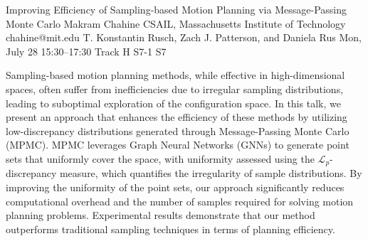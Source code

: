 \begin{talk}
  {Improving Efficiency of Sampling-based Motion Planning via Message-Passing Monte Carlo}%
  {Makram Chahine}%
  {CSAIL, Massachusetts Institute of Technology}%
  {chahine@mit.edu}%
  {T. Konstantin Rusch, Zach J. Patterson, and Daniela Rus}%
  {}%
  {Mon, July 28 15:30–17:30 Track H}%
  {S7-1}%
  {S7}%
  
				
			
Sampling-based motion planning methods, while effective in high-dimensional spaces, often suffer from inefficiencies due to irregular sampling distributions, leading to suboptimal exploration of the configuration space. In this talk, we present an approach that enhances the efficiency of these methods by utilizing low-discrepancy distributions generated through Message-Passing Monte Carlo (MPMC). MPMC leverages Graph Neural Networks (GNNs) to generate point sets that uniformly cover the space, with uniformity assessed using the $\mathcal{L}_p$-discrepancy measure, which quantifies the irregularity of sample distributions. By improving the uniformity of the point sets, our approach significantly reduces computational overhead and the number of samples required for solving motion planning problems. Experimental results demonstrate that our method outperforms traditional sampling techniques in terms of planning efficiency.

\medskip


\end{talk}


